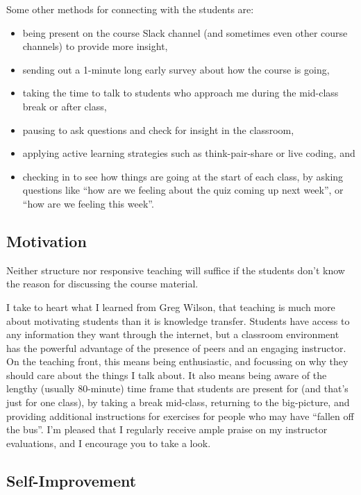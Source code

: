 \documentclass[]{book}
\providecommand{\tightlist}{%
  \setlength{\itemsep}{0pt}\setlength{\parskip}{0pt}}
\begin{document}
Some other methods for connecting with the students are:

\begin{itemize}
\tightlist
\item
  being present on the course Slack channel (and sometimes even other course channels) to provide more insight,
\item
  sending out a 1-minute long early survey about how the course is going,
\item
  taking the time to talk to students who approach me during the mid-class break or after class,
\item
  pausing to ask questions and check for insight in the classroom,
\item
  applying active learning strategies such as think-pair-share or live coding, and
\item
  checking in to see how things are going at the start of each class, by asking questions like ``how are we feeling about the quiz coming up next week'', or ``how are we feeling this week''.
\end{itemize}

\hypertarget{motivation}{%
\subsection{Motivation}\label{motivation}}

Neither structure nor responsive teaching will suffice if the students don't know the reason for discussing the course material.

I take to heart what I learned from Greg Wilson, that teaching is much more about motivating students than it is knowledge transfer. Students have access to any information they want through the internet, but a classroom environment has the powerful advantage of the presence of peers and an engaging instructor. On the teaching front, this means being enthusiastic, and focussing on why they should care about the things I talk about. It also means being aware of the lengthy (usually 80-minute) time frame that students are present for (and that's just for one class), by taking a break mid-class, returning to the big-picture, and providing additional instructions for exercises for people who may have ``fallen off the bus''. I'm pleased that I regularly receive ample praise on my instructor evaluations, and I encourage you to take a look.

\hypertarget{self-improvement}{%
\subsection{Self-Improvement}\label{self-improvement}}
\end{document}
